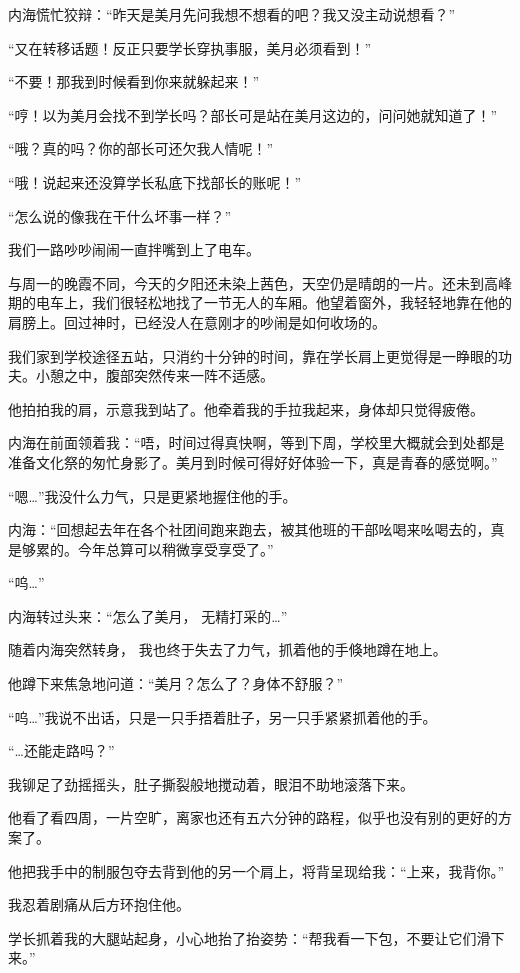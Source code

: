 内海慌忙狡辩：“昨天是美月先问我想不想看的吧？我又没主动说想看？”

“又在转移话题！反正只要学长穿执事服，美月必须看到！”

“不要！那我到时候看到你来就躲起来！”

“哼！以为美月会找不到学长吗？部长可是站在美月这边的，问问她就知道了！”

“哦？真的吗？你的部长可还欠我人情呢！”

“哦！说起来还没算学长私底下找部长的账呢！”

“怎么说的像我在干什么坏事一样？”

我们一路吵吵闹闹一直拌嘴到上了电车。

与周一的晚霞不同，今天的夕阳还未染上茜色，天空仍是晴朗的一片。还未到高峰期的电车上，我们很轻松地找了一节无人的车厢。他望着窗外，我轻轻地靠在他的肩膀上。回过神时，已经没人在意刚才的吵闹是如何收场的。

我们家到学校途径五站，只消约十分钟的时间，靠在学长肩上更觉得是一睁眼的功夫。小憩之中，腹部突然传来一阵不适感。

他拍拍我的肩，示意我到站了。他牵着我的手拉我起来，身体却只觉得疲倦。

内海在前面领着我：“唔，时间过得真快啊，等到下周，学校里大概就会到处都是准备文化祭的匆忙身影了。美月到时候可得好好体验一下，真是青春的感觉啊。”

“嗯…”我没什么力气，只是更紧地握住他的手。

内海：“回想起去年在各个社团间跑来跑去，被其他班的干部吆喝来吆喝去的，真是够累的。今年总算可以稍微享受享受了。”

“呜…”

内海转过头来：“怎么了美月， 无精打采的…”

随着内海突然转身， 我也终于失去了力气，抓着他的手倏地蹲在地上。

他蹲下来焦急地问道：“美月？怎么了？身体不舒服？”

“呜…”我说不出话，只是一只手捂着肚子，另一只手紧紧抓着他的手。

“…还能走路吗？”

我铆足了劲摇摇头，肚子撕裂般地搅动着，眼泪不助地滚落下来。

他看了看四周，一片空旷，离家也还有五六分钟的路程，似乎也没有别的更好的方案了。

他把我手中的制服包夺去背到他的另一个肩上，将背呈现给我：“上来，我背你。”

我忍着剧痛从后方环抱住他。

学长抓着我的大腿站起身，小心地抬了抬姿势：“帮我看一下包，不要让它们滑下来。”

